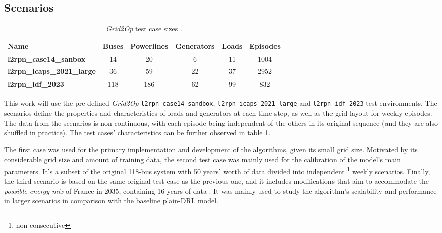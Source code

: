 \subsection{Scenarios} 

\begin{table}[H] 
	\centering
	\caption{\textit{Grid2Op} test case sizes \cite{rtefranceGrid2OpDocumentation}.}
	\begin{tabular}{lccccc}
		\toprule
		\textbf{Name} & \textbf{Buses} & \textbf{Powerlines} & \textbf{Generators} & \textbf{Loads} & \textbf{Episodes} \\
		\midrule
		\textbf{l2rpn\_case14\_sanbox} & 14 & 20 & 6 & 11 & 1004 \\ \textbf{l2rpn\_icaps\_2021\_large} & 36 & 59 & 22 & 37 & 2952 \\
		\textbf{l2rpn\_idf\_2023} & 118 & 186 & 62 & 99 & 832 \\
		\bottomrule
	\end{tabular}
	\label{tab:test-case}
\end{table}

This work will use the pre-defined \textit{Grid2Op} \texttt{l2rpn\_case14\_sandbox}, \texttt{l2rpn\_icaps\_2021\_large} and \texttt{l2rpn\_idf\_2023} test environments. The scenarios define the properties and characteristics of loads and generators at each time step, as well as the grid layout \cite{rtefranceGrid2OpDocumentation} for weekly episodes. The data from the scenarios is non-continuous, with each episode being independent of the others in its original sequence (and they are also shuffled in practice). The test cases' characteristics can be further observed in table \ref{tab:test-case}. \par
The first case was used for the primary implementation and development of the algorithms, given its small grid size. Motivated by its considerable grid size and amount of training data, the second test case was mainly used for the calibration of the model's main parameters. It's a subset of the original 118-bus system \cite{christiePowerSystemsTesta} with 50 years' worth of data divided into independent \footnote{non-consecutive} weekly scenarios. Finally, the third scenario is based on the same original test case as the previous one, and it includes modifications that aim to accommodate the \textit{possible energy mix} of France in 2035, containing 16 years of data \cite{rtefranceGrid2OpDocumentation}. It was mainly used to study the algorithm's scalability and performance in larger scenarios in comparison with the baseline plain-\ac{DRL} model. \par


